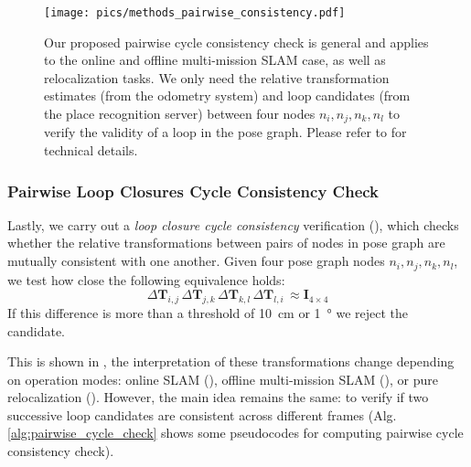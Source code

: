 \begin{figure}[htbp]
  \centering
  \texttt{[image: pics/methods\_pairwise\_consistency.pdf]}
  \caption{Our proposed pairwise cycle consistency check is general and applies to the online and offline multi-mission SLAM case, as well as relocalization tasks. We only need the relative transformation estimates (from the odometry system) and loop candidates (from the place recognition server) between four nodes $n_i, n_j, n_k, n_l$ to verify the validity of a loop in the pose graph. Please refer to  for technical details.}
  \label{fig:cycle-consistency}
\end{figure}
\subsubsection*{\textbf{Pairwise Loop Closures Cycle Consistency Check}}
Lastly, we carry out a \emph{loop closure cycle consistency} verification (), which checks whether the relative transformations between pairs of nodes in pose graph are mutually consistent with one another. Given four pose graph nodes $n_i, n_j, n_k, n_l$, we test how close the following equivalence holds:
\begin{equation}
\Delta\mathbf{T}_{i,j}\, \Delta\mathbf{T}_{j,k}\, \Delta\mathbf{T}_{k,l}\, \Delta\mathbf{T}_{l,i}\, \approx \mathbf{I}_{4\times4} 
\end{equation}
If this difference is more than a threshold of \SI{10}{\centi\meter} or \SI{1}{\degree} we reject the candidate. 

This is shown in , the interpretation of these transformations change depending on operation modes: online SLAM (), offline multi-mission SLAM (), or pure relocalization (). However, the main idea remains the same: to verify if two successive loop candidates are consistent across different frames (Alg.\ref{alg:pairwise_cycle_check} shows some pseudocodes for computing pairwise cycle consistency check).


